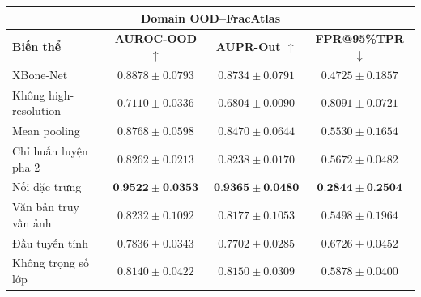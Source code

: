 \begin{table}[H]
\begin{tabular}{|l|c|c|c|}
\hline
\multicolumn{4}{|c|}{\textbf{Domain OOD--FracAtlas}} \\ \hline
\textbf{Biến thể} & \textbf{AUROC-OOD $\uparrow$} &
\textbf{AUPR-Out $\uparrow$} & \textbf{FPR@95\%TPR $\downarrow$} \\ \hline
\cellcolor{gray!12}XBone-Net &
\cellcolor{gray!12}$0{.}8878\pm0{.}0793$ &
\cellcolor{gray!12}$0{.}8734\pm0{.}0791$ &
\cellcolor{gray!12}$0{.}4725\pm0{.}1857$ \\ \hline
Không high-resolution &
$0{.}7110\pm0{.}0336$ & $0{.}6804\pm0{.}0090$ & $0{.}8091\pm0{.}0721$ \\ \hline
Mean pooling &
$0{.}8768\pm0{.}0598$ & $0{.}8470\pm0{.}0644$ & $0{.}5530\pm0{.}1654$ \\ \hline
Chỉ huấn luyện pha 2 &
$0{.}8262\pm0{.}0213$ & $0{.}8238\pm0{.}0170$ & $0{.}5672\pm0{.}0482$ \\ \hline
Nối đặc trưng &
$\mathbf{0{.}9522\pm0{.}0353}$ & $\mathbf{0{.}9365\pm0{.}0480}$ & $\mathbf{0{.}2844\pm0{.}2504}$ \\ \hline
Văn bản truy vấn ảnh &
$0{.}8232\pm0{.}1092$ & $0{.}8177\pm0{.}1053$ & $0{.}5498\pm0{.}1964$ \\ \hline
Đầu tuyến tính &
$0{.}7836\pm0{.}0343$ & $0{.}7702\pm0{.}0285$ & $0{.}6726\pm0{.}0452$ \\ \hline
Không trọng số lớp &
$0{.}8140\pm0{.}0422$ & $0{.}8150\pm0{.}0309$ & $0{.}5878\pm0{.}0400$ \\ \hline
\end{tabular}

\vspace{0.5em}


\end{table}
